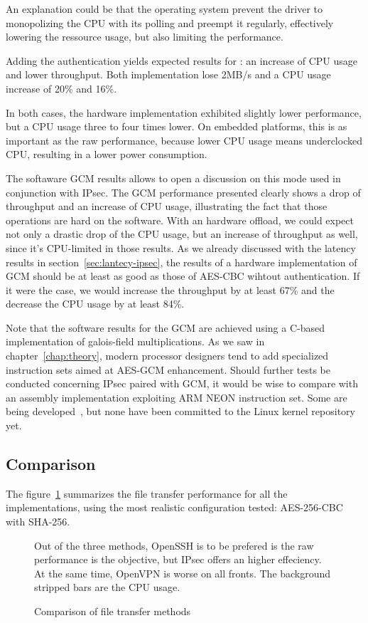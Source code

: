 \noindent An explanation could be that the operating system prevent the driver to monopolizing the CPU with its polling and preempt it regularly, effectively lowering the ressource usage, but also limiting the performance.

Adding the authentication yields expected results for : an increase of CPU usage and lower throughput.
Both implementation lose 2MB/s and a CPU usage increase of 20\% and 16\%.

In both cases, the hardware implementation exhibited slightly lower performance, but a CPU usage three to four times lower.
On embedded platforms, this is as important as the raw performance, because lower CPU usage means underclocked CPU, resulting in a lower power consumption.\newline{}

The softaware GCM results allows to open a discussion on this mode used in conjunction with IPsec.
The GCM performance presented clearly shows a drop of throughput and an increase of CPU usage, illustrating the fact that those operations are hard on the software.
With an hardware offload, we could expect not only a drastic drop of the CPU usage, but an increase of throughput as well, since it's CPU-limited in those results.
As we already discussed with the latency results in section~\ref{sec:lantecy-ipsec}, the results of a hardware implementation of GCM should be at least as good as those of AES-CBC wihtout authentication.
If it were the case, we would increase the throughput by at least 67\% and the decrease the CPU usage by at least 84\%.

Note that the software results for the GCM are achieved using a C-based implementation of galois-field multiplications.
As we saw in chapter~\ref{chap:theory}, modern processor designers tend to add specialized instruction sets aimed at AES-GCM enhancement.
Should further tests be conducted concerning IPsec paired with GCM, it would be wise to compare with an assembly implementation exploiting ARM NEON instruction set.
Some are being developed~\cite{Conrado2013,Danilo2013}, but none have been committed to the Linux kernel repository yet.


\subsection{Comparison}
The figure~\ref{fig:ftp-bench-comparison} summarizes the file transfer performance for all the implementations, using the most realistic configuration tested: AES-256-CBC with SHA-256.
\begin{figure}[ht]

\caption{Comparison of file transfer methods}{Out of the three methods, OpenSSH is to be prefered is the raw performance is the objective, but IPsec offers an higher effeciency. At the same time, OpenVPN is worse on all fronts. The background stripped bars are the CPU usage.}
\label{fig:ftp-bench-comparison}
\end{figure}

